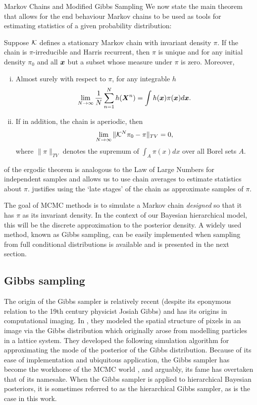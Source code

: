 \begin{chapter}{Markov Chains and Modified Gibbs Sampling}
We now state the main theorem that allows for the end behaviour Markov chains to be used as tools for estimating statistics of a given probability distribution:
\begin{thm} \label{thm:ergodicTheorem}
  \citep{tierney1994markov} Suppose $\mathcal K$ defines a stationary Markov chain with invariant density $\pi$. If the chain is $\pi$-irreducible and Harris recurrent, then $\pi$ is unique and for any initial density $\pi_0$ and all $\mbox{\boldmath$x$}$ but a subset whose measure under $\pi$ is zero. Moreover,
  \begin{enumerate}[(i)]
    \item Almost surely with respect to $\pi$, for any integrable $h$ \begin{equation} \lim_{N\to \infty}\frac 1N\sum_{n=1}^N h(\mbox{\boldmath$X$}^n) = \int h(\mbox{\boldmath$x$}) \pi(\mbox{\boldmath$x$}) d\mbox{\boldmath$x$}. \label{eq:ergodicStat}\end{equation}
    \item If in addition, the chain is aperiodic, then \begin{equation} \lim_{N\to \infty}\|\mathcal K^N\pi_0 - \pi\|_{TV} = 0, \label{eq:ergodicDist}\end{equation}
    where $\|\pi\|_{TV}$ denotes the supremum of $\int_A \pi(x) dx$ over all Borel sets $A$.
  \end{enumerate}
\end{thm}
 of the ergodic theorem is analogous to the Law of Large Numbers for independent samples and allows us to use chain averages to estimate statistics about $\pi$.  
 justifies using the `late stages' of the chain as approximate samples of $\pi$.

The goal of MCMC methods is to simulate a Markov chain \emph{designed} so that it has $\pi$ as its invariant density.  
In the context of our Bayesian hierarchical model, this will be the discrete approximation to the posterior density.
A widely used method, known as Gibbs sampling, can be easily implemented when sampling from full conditional distributions is available and is presented in the next section.

\subsection{Gibbs sampling}

The origin of the Gibbs sampler is relatively recent (despite its eponymous relation to the 19th century physicist Josiah Gibbs) and has its origins in computational imaging. 
In \citep{geman1984stochastic}, they modeled the spatial structure of pixels in an image via the Gibbs distribution which originally arose from modelling particles in a lattice system.
They developed the following simulation algorithm for approximating the mode of the posterior of the Gibbs distribution.
Because of its ease of implementation and ubiquitous application, the Gibbs sampler has become the workhorse of the MCMC world \citep{robert2013monte}, and arguably, its fame has overtaken that of its namesake.
When the Gibbs sampler is applied to hierarchical Bayesian posteriors, it is sometimes referred to as the hierarchical Gibbs sampler, as is the case in this work.


\end{chapter}
